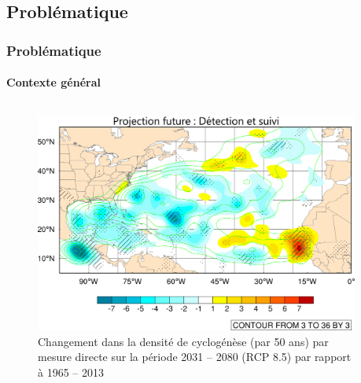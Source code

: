 \documentclass[aspectratio=169, usepdftitle=false, xcolor={dvipsnames}, 9pt,table]{beamer}
\begin{document}
\begin{frame}[t]
\begin{columns}[t]
\begin{column}{0.33\textwidth}
\begin{figure}
            \end{figure}        
        \end{column}
    \end{columns}
\end{frame}

\subsection{Problématique}
\begin{frame}[t]
    \frametitle{Problématique}
    \framesubtitle{Contexte général}
    \vspace{-1em}
    \begin{columns}[b]
        \begin{column}{0.5\textwidth}
            \begin{figure}[h]
                \centering
                \includegraphics[width=\textwidth]{Figures/density_fitted_title2.png}
                \caption{\scriptsize Changement dans la densité de cyclogénèse (par 50 ans) par mesure \mbox{\alert{directe}} sur la période 2031 -- 2080 (RCP
                8.5) par rapport à 1965 -- 2013 \mbox{\parencite{chauvin_future_2020}}}
            \end{figure}
        \end{column}
        \begin{column}{0.5\textwidth}

\end{column}
\end{columns}
\end{frame}
\end{document}
